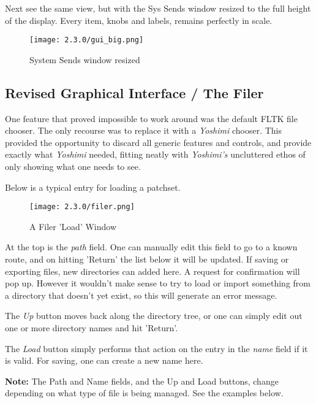    Next see the same view, but with the Sys Sends window resized to the
   full height of the display. Every item, knobs and labels,
   remains perfectly in scale.

   \begin{figure}[H]
      \centering
      \texttt{[image: 2.3.0/gui\_big.png]}
      \caption{System Sends window resized}
      \label{fig:resized_sends_window}
   \end{figure}

\subsection{Revised Graphical Interface / The Filer}
\label{subsec:interface_filer}

   One feature that proved impossible to work around was the default FLTK file
   chooser. The only recourse was to replace it with a \textsl{Yoshimi}
   chooser.
   This provided the opportunity to discard all generic features and controls,
   and provide exactly what \textsl{Yoshimi} needed, fitting neatly with
   \textsl{Yoshimi's} uncluttered ethos of only showing what one needs to see.

   Below is a typical entry for loading a patchset.

   \begin{figure}[H]
      \centering
      \texttt{[image: 2.3.0/filer.png]}
      \caption{A Filer 'Load' Window}
      \label{fig:filer_load_window}
   \end{figure}

   At the top is the \textsl{path} field. One can manually edit this field to go
   to a known route, and on hitting 'Return' the list below it will be updated.
   If saving or exporting files, new directories can added here. A request for
   confirmation will pop up. However it wouldn't make sense to try to load or
   import something from a directory that doesn't yet exist, so this will
   generate an error message.

   The \textsl{Up} button moves back along the directory tree, or one can simply
   edit out one or more directory names and hit 'Return'.

   The \textsl{Load} button simply performs that action on the entry in the
   \textsl{name} field if it is valid. For saving, one can create a
   new name here.

    \textbf{Note:} The Path and Name fields, and the Up and Load buttons,
    change depending on what type of file is being managed. See the examples
    below.

